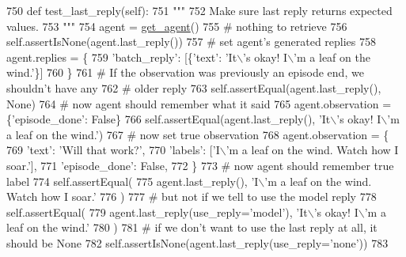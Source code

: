 \begin{DoxyCode}
750     \textcolor{keyword}{def }test\_last\_reply(self):
751         \textcolor{stringliteral}{"""}
752 \textcolor{stringliteral}{        Make sure last reply returns expected values.}
753 \textcolor{stringliteral}{        """}
754         agent = \hyperlink{namespacetests_1_1test__torch__agent_ae929d109305aaea29fbfa13ecf1f32e9}{get\_agent}()
755         \textcolor{comment}{# nothing to retrieve}
756         self.assertIsNone(agent.last\_reply())
757         \textcolor{comment}{# set agent's generated replies}
758         agent.replies = \{
759             \textcolor{stringliteral}{'batch\_reply'}: [\{\textcolor{stringliteral}{'text'}: \textcolor{stringliteral}{'It\(\backslash\)'s okay! I\(\backslash\)'m a leaf on the wind.'}\}]
760         \}
761         \textcolor{comment}{# If the observation was previously an episode end, we shouldn't have any}
762         \textcolor{comment}{# older reply}
763         self.assertEqual(agent.last\_reply(), \textcolor{keywordtype}{None})
764         \textcolor{comment}{# now agent should remember what it said}
765         agent.observation = \{\textcolor{stringliteral}{'episode\_done'}: \textcolor{keyword}{False}\}
766         self.assertEqual(agent.last\_reply(), \textcolor{stringliteral}{'It\(\backslash\)'s okay! I\(\backslash\)'m a leaf on the wind.'})
767         \textcolor{comment}{# now set true observation}
768         agent.observation = \{
769             \textcolor{stringliteral}{'text'}: \textcolor{stringliteral}{'Will that work?'},
770             \textcolor{stringliteral}{'labels'}: [\textcolor{stringliteral}{'I\(\backslash\)'m a leaf on the wind. Watch how I soar.'}],
771             \textcolor{stringliteral}{'episode\_done'}: \textcolor{keyword}{False},
772         \}
773         \textcolor{comment}{# now agent should remember true label}
774         self.assertEqual(
775             agent.last\_reply(), \textcolor{stringliteral}{'I\(\backslash\)'m a leaf on the wind. Watch how I soar.'}
776         )
777         \textcolor{comment}{# but not if we tell to use the model reply}
778         self.assertEqual(
779             agent.last\_reply(use\_reply=\textcolor{stringliteral}{'model'}), \textcolor{stringliteral}{'It\(\backslash\)'s okay! I\(\backslash\)'m a leaf on the wind.'}
780         )
781         \textcolor{comment}{# if we don't want to use the last reply at all, it should be None}
782         self.assertIsNone(agent.last\_reply(use\_reply=\textcolor{stringliteral}{'none'}))
783 
\end{DoxyCode}
\mbox{\label{classtests_1_1test__torch__agent_1_1TestTorchAgent_abe59ca8c2f6927c0ba6f0e5ce7d3a4f2}} 
